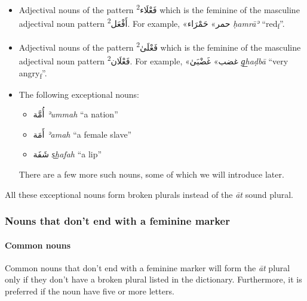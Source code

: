 \documentclass[
  10pt,
]{book}
\providecommand{\tightlist}{%
  \setlength{\itemsep}{0pt}\setlength{\parskip}{0pt}}
\begin{document}
\begin{itemize}
\item
  Adjectival nouns of the pattern \foreignlanguage{arabic}{فَعْلَاء\textsuperscript{2}} which is the feminine of the masculine adjectival noun pattern \foreignlanguage{arabic}{أَفْعَل\textsuperscript{2}}. For example, \foreignlanguage{arabic}{«حمر»} \foreignlanguage{arabic}{حَمْرَاء} \emph{ḥamrāʾ} \enquote{red\textsubscript{f}}.
\item
  Adjectival nouns of the pattern \foreignlanguage{arabic}{فَعْلَىٰ\textsuperscript{2}} which is the feminine of the masculine adjectival noun pattern \foreignlanguage{arabic}{فَعْلَان\textsuperscript{2}}. For example, \foreignlanguage{arabic}{«غضب»} \foreignlanguage{arabic}{غَضْبَىٰ} \emph{g͟haḍbā} \enquote{very angry\textsubscript{f}}.
\item
  The following exceptional nouns:

  \begin{itemize}
  \tightlist
  \item
    \foreignlanguage{arabic}{أُمَّة} \emph{ʾummah} \enquote{a nation}
  \item
    \foreignlanguage{arabic}{أَمَة} \emph{ʾamah} \enquote{a female slave}
  \item
    \foreignlanguage{arabic}{شَفَة} \emph{s͟hafah} \enquote{a lip}
  \end{itemize}

  There are a few more such nouns, some of which we will introduce later.
\end{itemize}

All these exceptional nouns form broken plurals instead of the \emph{āt} sound plural.

\subsubsection{Nouns that don't end with a feminine marker}\label{nouns-that-dont-end-with-a-feminine-marker}

\paragraph*{Common nouns}\label{common-nouns-1}

Common nouns that don't end with a feminine marker will form the \emph{āt} plural only if they don't have a broken plural listed in the dictionary. Furthermore, it is preferred if the noun have five or more letters.
\end{document}
